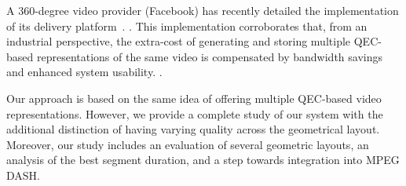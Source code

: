 A  360-degree video provider (Facebook) has
recently detailed the implementation of its delivery
platform~\cite{facebook}.
. This implementation
corroborates that, from an industrial perspective, the extra-cost of
generating and storing multiple \ac{QEC}-based representations of the
same video is compensated by bandwidth savings and
enhanced system usability.
.

Our approach is based on the same
idea of offering multiple \ac{QEC}-based video representations.
However, we provide a complete study of our system with the additional
distinction of having varying quality across the geometrical layout. Moreover,
our study includes an evaluation of several
geometric layouts, an analysis of the best segment duration, 
and a step towards integration into MPEG \ac{DASH}.
